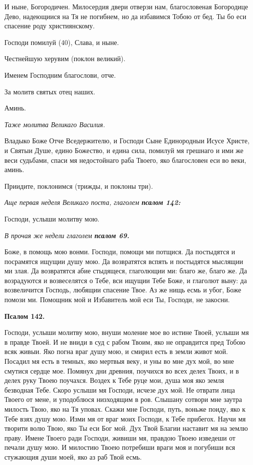 И ныне, Богородичен. Милосердия двери отверзи нам, благословеная Богородице Дево, надеющиися на Тя не погибнем, но да избавимся Тобою от бед. Ты бо еси спасение роду християнскому.

Господи помилуй (40), Слава, и ныне.

Честнейшую херувим (поклон великий).

Именем Господним благослови, отче.

За молитв святых отец наших.

Аминь.


\itshape Таже молитва Великаго Василия.\normalfont{}


Владыко Боже Отче Вседержителю, и Господи Сыне Единородныи Исусе Христе, и Святыи Душе, едино Божество, и едина сила, помилуй мя грешнаго и ими же веси судьбами, спаси мя недостойнаго раба Твоего, яко благословен еси во веки, аминь.

Приидите, поклонимся (трижды, и поклоны три).


\itshape Аще первая неделя Великаго поста, глаголем \bfseries псалом 142:\normalfont{}\normalfont{}


Господи, услыши молитву мою.


\itshape В прочая же недели глаголем \bfseries псалом 69\normalfont{}.\normalfont{}


Боже, в помощь мою вонми. Господи, помощи ми потщися. Да постыдятся и посрамятся ищущии душу мою. Да возвратятся вспять и постыдятся мыслящии ми злая. Да возвратятся абие стыдящеся, глаголющии ми: благо же, благо же. Да возрадуются и возвеселятся о Тебе, вси ищущии Тебе Боже, и глаголют выну: да возвеличится Господь, любящии спасение Твое. Аз же нищь есмь и убог, Боже помози ми. Помощник мой и Избавитель мой еси Ты, Господи, не закосни.


\medskip


\bfseries Псалом 142.\normalfont{}\nopagebreak


Господи, услыши молитву мою, внуши моление мое во истине Твоей, услыши мя в правде Твоей. И не вниди в суд с рабом Твоим, яко не оправдится пред Тобою всяк живыи. Яко погна враг душу мою, и смирил есть в земли живот мой. Посадил мя есть в темных, яко мертвыя веку, и уны во мне дух мой, во мне смутися сердце мое. Помянух дни древния, поучихся во всех делех Твоих, и в делех руку Твоею поучахся. Воздех к Тебе руце мои, душа моя яко земля безводная Тебе. Скоро услыши мя Господи, исчезе дух мой. Не отврати лица Твоего от мене, и уподоблюся низходящим в ров. Слышану сотвори мне заутра милость Твою, яко на Тя уповах. Скажи мне Господи, путь, воньже поиду, яко к Тебе взях душу мою. Изми мя от враг моих Господи, к Тебе прибегох. Научи мя творити волю Твою, яко Ты еси Бог мой. Дух Твой Благии наставит мя на землю праву. Имене Твоего ради Господи, живиши мя, правдою Твоею изведеши от печали душу мою. И милостию Твоею потребиши враги моя и погубиши вся стужающия души моей, яко аз раб Твой есмь.

